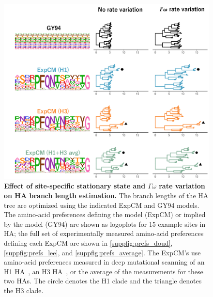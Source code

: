\documentclass[11pt]{article}
\begin{document}
\begin{figure}
\centerline{\includegraphics[width=\textwidth]{figures/empirical_trees.pdf}}
\caption{\label{fig:empirical_trees}
\textbf{Effect of site-specific stationary state and $\Gamma\omega$ rate variation on HA branch length estimation.} 
The branch lengths of the HA tree are optimized using the indicated ExpCM and GY94 models. 
The amino-acid preferences defining the model (ExpCM) or implied by the model (GY94) are shown as logoplots for 15 example sites in HA; the full set of experimentally measured amino-acid preferences defining each ExpCM are shown in \ref{suppfig:prefs_doud}, \ref{suppfig:prefs_lee}, and \ref{suppfig:prefs_average}. 
The ExpCM's use amino-acid preferences measured in deep mutational scanning of an H1 HA~\cite{doud2016accurate}, an H3 HA~\citep{lee2018deep}, or the average of the measurements for these two HAs.
The circle denotes the H1 clade and the triangle denotes the H3 clade. 
}
\end{figure}
\end{document}
